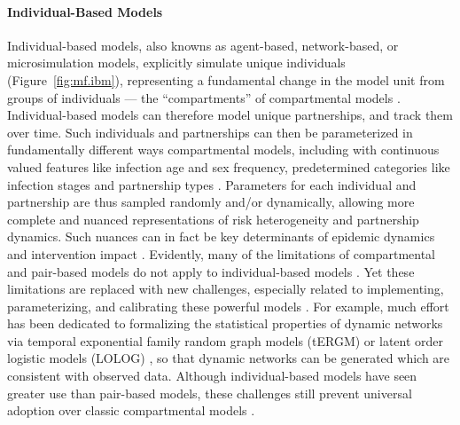 \paragraph{Individual-Based Models}
Individual-based models, also knowns as agent-based, network-based, or microsimulation models,
explicitly simulate unique individuals (Figure~\ref{fig:mf.ibm}),
representing a fundamental change in the model unit from groups of individuals
--- \ie the ``compartments'' of compartmental models \cite{Rao2021}.
Individual-based models can therefore model unique partnerships, and track them over time.
Such individuals and partnerships can then be
parameterized in fundamentally different ways \vs compartmental models,
including with continuous valued features like infection age and sex frequency,
\vs predetermined categories like infection stages and partnership types \cite{Pellis2015,Rao2021}.
Parameters for each individual and partnership are thus sampled randomly and/or dynamically,
allowing more complete and nuanced representations of risk heterogeneity and partnership dynamics.
Such nuances can in fact be key determinants of epidemic dynamics and intervention impact
\cite{Hontelez2013,Johnson2016mf}.
Evidently, many of the limitations of compartmental and pair-based models
do not apply to individual-based models \cite{Rao2021}.
Yet these limitations are replaced with new challenges,
especially related to implementing, parameterizing, and calibrating these powerful models
\cite{Rao2021,Pellis2015,Hazelbag2020}.
For example, much effort has been dedicated to
formalizing the statistical properties of dynamic networks
via temporal exponential family random graph models (tERGM) \cite{Jenness2018}
or latent order logistic models (LOLOG) \cite{Clark2022},
so that dynamic networks can be generated which are consistent with observed data.
Although individual-based models have seen greater use than pair-based models,
these challenges still prevent universal adoption over classic compartmental models \cite{Rao2021}.
